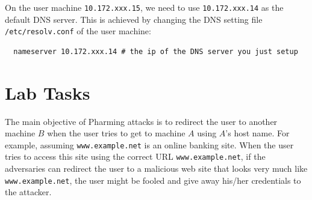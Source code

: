 On the user machine {\tt 10.172.xxx.15}, we need to use 
{\tt 10.172.xxx.14} as the default DNS server. This is achieved by changing
the DNS setting file \texttt{/etc/resolv.conf} of the user machine:

\begin{verbatim}
  nameserver 10.172.xxx.14 # the ip of the DNS server you just setup
\end{verbatim}









\section{Lab Tasks}


The main objective of Pharming attacks is to redirect the user
to another machine $B$ when the user tries to get to machine $A$ using
$A$'s host name. For example, assuming {\tt www.example.net} is an online banking 
site.  When the user tries to access this site using the
correct URL {\tt www.example.net}, if the adversaries can redirect the user 
to a malicious web site that looks very much like 
{\tt www.example.net}, the user might be fooled and give away 
his/her credentials to the attacker. 

